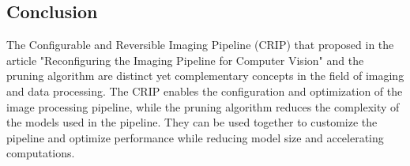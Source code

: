 
\subsection*{Conclusion}
The Configurable and Reversible Imaging Pipeline (CRIP) that proposed in the article "Reconfiguring the Imaging Pipeline for Computer Vision" and the pruning algorithm are distinct yet complementary concepts in the field of imaging and data processing. The CRIP enables the configuration and optimization of the image processing pipeline, while the pruning algorithm reduces the complexity of the models used in the pipeline. They can be used together to customize the pipeline and optimize performance while reducing model size and accelerating computations.

